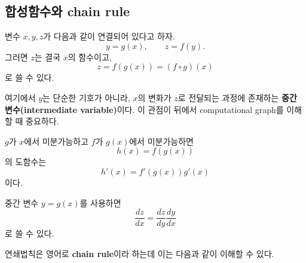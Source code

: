 \documentclass[11pt,a4paper]{article}
\begin{document}
\subsection{합성함수와 chain rule}

변수 $x,y,z$가 다음과 같이 연결되어 있다고 하자.
\[
y=g(x), \qquad z=f(y).
\]
그러면 $z$는 결국 $x$의 함수이고,
\[
z=f(g(x))=(f\circ g)(x)
\]
로 쓸 수 있다.

\begin{center}
\end{center}

여기에서 $y$는 단순한 기호가 아니라, $x$의 변화가 $z$로 전달되는 과정에 존재하는
\textbf{중간 변수(intermediate variable)}이다. 이 관점이 뒤에서 computational graph를 이해할 때 중요하다.


$g$가 $x$에서 미분가능하고 $f$가 $g(x)$에서 미분가능하면
\[
h(x)=f(g(x))
\]
의 도함수는
\[
\boxed{
 h'(x)=f'(g(x))g'(x)
}
\]
이다.

중간 변수 $y=g(x)$를 사용하면
\[
\boxed{
\frac{dz}{dx}
=
\frac{dz}{dy}\frac{dy}{dx}
}
\]
로 쓸 수 있다.

연쇄법칙은 영어로 \textbf{chain rule}이라 하는데 이는 다음과 같이
이해할 수 있다.
\end{document}
